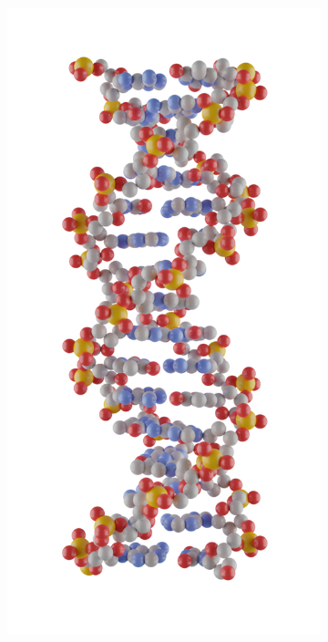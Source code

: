 \begin{figure}[ht]
  \begin{centering}
  \begin{subfigure}[t]{\dimexpr.35\linewidth-1.3em\relax}
  \centering
  \vspace{-0.9cm}
  \includegraphics[width=.9\linewidth,valign=t]{Figures/ballnstick.png}
  \end{subfigure}%

\end{centering}
\end{figure}
